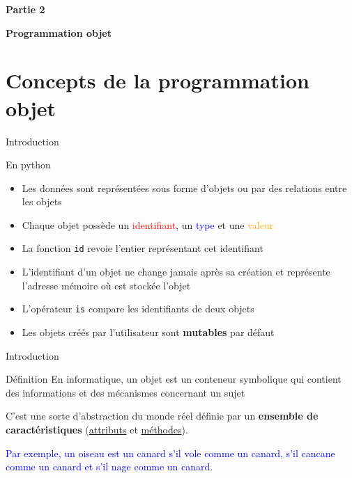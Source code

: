 \documentclass[10pt]{beamer}
\begin{document}
 
\maketitle

\begin{frame}{}
  \centering
  \Large
  \textbf{Partie 2}

  \textbf{Programmation objet}
\end{frame}

\section{Concepts de la programmation objet}




\begin{frame}{Introduction}

  \begin{block}{En python}
    \medskip
    \begin{itemize}
      \item<+-> Les données sont représentées sous forme d'objets ou par des relations entre les objets
      \item<+-> Chaque objet possède un \textcolor{red}{identifiant}, un \textcolor{blue}{type} et une \textcolor{orange}{valeur}
      \item<+-> La fonction \texttt{id} revoie l'entier représentant cet identifiant
      \item<+-> L'identifiant d'un objet ne change jamais après sa création et représente l'adresse mémoire où est stockée l'objet
      \item<+-> L'opérateur \texttt{is} compare les identifiants de deux objets
      \item<+-> Les objets créés par l'utilisateur sont \textbf{mutables} par défaut
    \end{itemize}
  \end{block}

\end{frame}



\begin{frame}{Introduction}

  \begin{block}{Définition}
    \medskip
    En informatique, un objet est un conteneur symbolique qui contient des informations et des mécanismes concernant un sujet

    C'est une sorte d'abstraction du monde réel définie par un \textbf{ensemble de caractéristiques} (\underline{attributs} et \underline{méthodes}).
  \end{block}

  \textcolor{blue}{Par exemple, un oiseau est un canard s'il vole comme un canard, s'il cancane comme un canard et s'il nage comme un canard.}
\end{frame}
\end{document}
